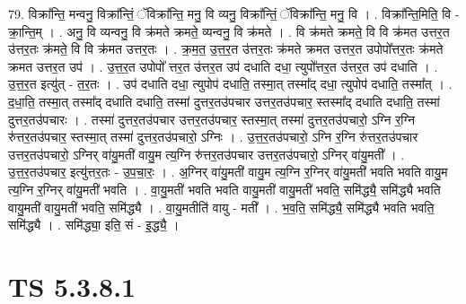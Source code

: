 \documentclass[17pt]{extarticle}
\begin{document}
79. विक्रा᳚न्ति॒ मन्वनु॒ विक्रा᳚न्तिं॒ ॅविक्रा᳚न्ति॒ मनु॒ वि व्यनु॒ विक्रा᳚न्तिं॒ ॅविक्रा᳚न्ति॒ मनु॒ वि । . विक्रा᳚न्ति॒मिति॒ वि - क्रा॒न्ति॒म् । . अनु॒ वि व्यन्वनु॒ वि क्र॑मते क्रमते॒ व्यन्वनु॒ वि क्र॑मते । . वि क्र॑मते क्रमते॒ वि वि क्र॑मत उत्तर॒त उ॑त्तर॒तः क्र॑मते॒ वि वि क्र॑मत उत्तर॒तः । . क्र॒म॒त॒ उ॒त्त॒र॒त उ॑त्तर॒तः क्र॑मते क्रमत उत्तर॒त उपोपो᳚त्तर॒तः क्र॑मते क्रमत उत्तर॒त उप॑ । . उ॒त्त॒र॒त उपोपो᳚ त्तर॒त उ॑त्तर॒त उप॑ दधाति दधा॒ त्युपो᳚त्तर॒त उ॑त्तर॒त उप॑ दधाति । . उ॒त्त॒र॒त इत्यु॑त् - त॒र॒तः । . उप॑ दधाति दधा॒ त्युपोप॑ दधाति॒ तस्मा॒त् तस्मा᳚द् दधा॒ त्युपोप॑ दधाति॒ तस्मा᳚त् । . द॒धा॒ति॒ तस्मा॒त् तस्मा᳚द् दधाति दधाति॒ तस्मा॑ दुत्तर॒त‌उ॑पचार उत्तर॒त‌उ॑पचार॒ स्तस्मा᳚द् दधाति दधाति॒ तस्मा॑ दुत्तर॒त‌उ॑पचारः । . तस्मा॑ दुत्तर॒त‍उ॑पचार उत्तर॒त‍उ॑पचार॒ स्तस्मा॒त् तस्मा॑ दुत्तर॒त‍उ॑पचारो॒ ऽग्नि र॒ग्नि रु॑त्तर॒त‍उ॑पचार॒ स्तस्मा॒त् तस्मा॑ दुत्तर॒त‍उ॑पचारो॒ ऽग्निः । . उ॒त्त॒र॒त‍उ॑पचारो॒ ऽग्नि र॒ग्नि रु॑त्तर॒त‍उ॑पचार उत्तर॒त‍उ॑पचारो॒ ऽग्निर् वा॑यु॒मती॑ वायु॒म त्य॒ग्नि 
रु॑त्तर॒त‍उ॑पचार उत्तर॒त‍उ॑पचारो॒ ऽग्निर् वा॑यु॒मती᳚ । . उ॒त्त॒र॒त‍उ॑पचार॒ इत्यु॑त्तर॒तः - उ॒प॒चा॒रः॒ । . अ॒ग्निर् वा॑यु॒मती॑ वायु॒म त्य॒ग्नि र॒ग्निर् वा॑यु॒मती॑ भवति भवति वायु॒म त्य॒ग्नि र॒ग्निर् वा॑यु॒मती॑ भवति । . वा॒यु॒मती॑ भवति भवति वायु॒मती॑ वायु॒मती॑ भवति॒ समि॑द्ध्यै॒ समि॑द्ध्यै भवति वायु॒मती॑ वायु॒मती॑ भवति॒ समि॑द्ध्यै । . वा॒यु॒मतीति॑ वायु - मती᳚ । . भ॒व॒ति॒ समि॑द्ध्यै॒ समि॑द्ध्यै भवति भवति॒ समि॑द्ध्यै । . समि॑द्ध्या॒ इति॒ सं - इ॒द्ध्यै॒ । \newline
\pagebreak
{}

\section{ TS 5.3.8.1 }
\end{document}
